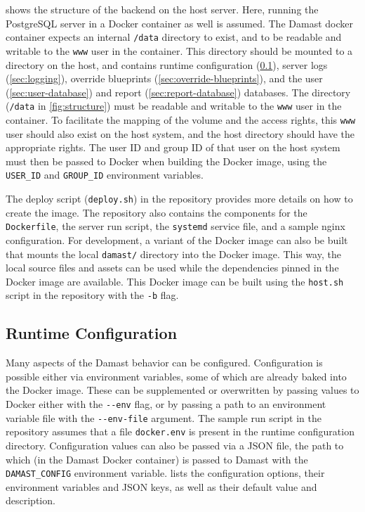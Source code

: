  shows the structure of the backend on the host server.
Here, running the PostgreSQL server in a Docker container as well is assumed.
The Damast docker container expects an internal \verb!/data! directory to exist, and to be readable and writable to the \verb!www! user in the container.
This directory should be mounted to a directory on the host, and contains runtime configuration (\cref{sec:runtime-configuration}), server logs (\cref{sec:logging}), override blueprints (\cref{sec:override-blueprints}), and the user (\cref{sec:user-database}) and report (\cref{sec:report-database}) databases.
The directory (\verb!/data! in \cref{fig:structure}) must be readable and writable to the \verb!www! user in the container.
To facilitate the mapping of the volume and the access rights, this \verb!www! user should also exist on the host system, and the host directory should have the appropriate rights.
The user ID and group ID of that user on the host system must then be passed to Docker when building the Docker image, using the \verb!USER_ID! and \verb!GROUP_ID! environment variables.

The deploy script (\verb!deploy.sh!) in the repository provides more details on how to create the image.
The repository also contains the components for the \verb!Dockerfile!, the server run script, the \verb!systemd! service file, and a sample nginx configuration.
For development, a variant of the Docker image can also be built that mounts the local \verb!damast/! directory into the Docker image.
This way, the local source files and assets can be used while the dependencies pinned in the Docker image are available.
This Docker image can be built using the \verb!host.sh! script in the repository with the \verb!-b! flag.


\subsection{Runtime Configuration}
\label{sec:runtime-configuration}

Many aspects of the Damast behavior can be configured.
Configuration is possible either via environment variables, some of which are already baked into the Docker image.
These can be supplemented or overwritten by passing values to Docker either with the \verb!--env! flag, or by passing a path to an environment variable file with the \verb!--env-file! argument.
The sample run script in the repository assumes that a file \verb!docker.env! is present in the runtime configuration directory.
Configuration values can also be passed via a JSON file, the path to which (in the Damast Docker container) is passed to Damast with the \verb!DAMAST_CONFIG! environment variable.
 lists the configuration options, their environment variables and JSON keys, as well as their default value and description.

